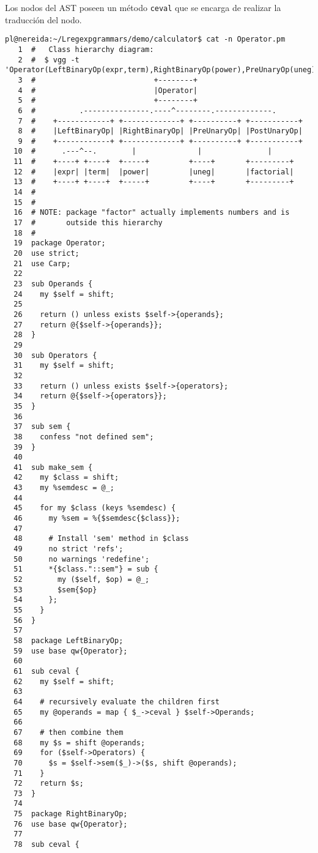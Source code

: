 Los nodos del AST poseen un método \verb|ceval| que se encarga de 
realizar la traducción del nodo.


\begin{verbatim}
pl@nereida:~/Lregexpgrammars/demo/calculator$ cat -n Operator.pm
   1  #   Class hierarchy diagram:
   2  #  $ vgg -t 'Operator(LeftBinaryOp(expr,term),RightBinaryOp(power),PreUnaryOp(uneg),PostUnaryOp(factorial))'
   3  #                           +--------+
   4  #                           |Operator|
   5  #                           +--------+
   6  #          .---------------.----^--------.-------------.
   7  #    +------------+ +-------------+ +----------+ +-----------+
   8  #    |LeftBinaryOp| |RightBinaryOp| |PreUnaryOp| |PostUnaryOp|
   9  #    +------------+ +-------------+ +----------+ +-----------+
  10  #      .---^--.        |              |               |
  11  #    +----+ +----+  +-----+         +----+       +---------+
  12  #    |expr| |term|  |power|         |uneg|       |factorial|
  13  #    +----+ +----+  +-----+         +----+       +---------+
  14  #
  15  #
  16  # NOTE: package "factor" actually implements numbers and is
  17  #       outside this hierarchy
  18  #
  19  package Operator;
  20  use strict;
  21  use Carp;
  22
  23  sub Operands {
  24    my $self = shift;
  25
  26    return () unless exists $self->{operands};
  27    return @{$self->{operands}};
  28  }
  29
  30  sub Operators {
  31    my $self = shift;
  32
  33    return () unless exists $self->{operators};
  34    return @{$self->{operators}};
  35  }
  36
  37  sub sem {
  38    confess "not defined sem";
  39  }
  40
  41  sub make_sem {
  42    my $class = shift;
  43    my %semdesc = @_;
  44
  45    for my $class (keys %semdesc) {
  46      my %sem = %{$semdesc{$class}};
  47
  48      # Install 'sem' method in $class
  49      no strict 'refs';
  50      no warnings 'redefine';
  51      *{$class."::sem"} = sub {
  52        my ($self, $op) = @_;
  53        $sem{$op}
  54      };
  55    }
  56  }
  57
  58  package LeftBinaryOp;
  59  use base qw{Operator};
  60
  61  sub ceval {
  62    my $self = shift;
  63
  64    # recursively evaluate the children first
  65    my @operands = map { $_->ceval } $self->Operands;
  66
  67    # then combine them
  68    my $s = shift @operands;
  69    for ($self->Operators) {
  70      $s = $self->sem($_)->($s, shift @operands);
  71    }
  72    return $s;
  73  }
  74
  75  package RightBinaryOp;
  76  use base qw{Operator};
  77
  78  sub ceval {

\end{verbatim}

